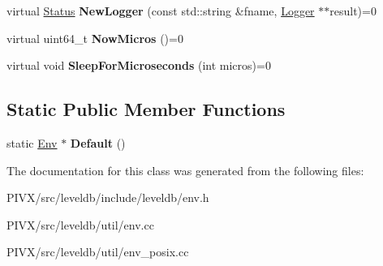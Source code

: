 \begin{DoxyCompactItemize}
\mbox{\label{classleveldb_1_1_env_a53a4c41d294fe619f13ec5b697ffc933}} 
virtual \mbox{\hyperlink{classleveldb_1_1_status}{Status}} {\bfseries New\+Logger} (const std\+::string \&fname, \mbox{\hyperlink{classleveldb_1_1_logger}{Logger}} $\ast$$\ast$result)=0
\item 
\mbox{\label{classleveldb_1_1_env_a988062bcd558ac02c62522ac2c8aa39f}} 
virtual uint64\+\_\+t {\bfseries Now\+Micros} ()=0
\item 
\mbox{\label{classleveldb_1_1_env_a43ad838cfb08db3d9e2197800cd33312}} 
virtual void {\bfseries Sleep\+For\+Microseconds} (int micros)=0
\end{DoxyCompactItemize}
\subsection*{Static Public Member Functions}
\begin{DoxyCompactItemize}
\item 
\mbox{\label{classleveldb_1_1_env_ae15b67e650ff6790059745fd1b3bf3e7}} 
static \mbox{\hyperlink{classleveldb_1_1_env}{Env}} $\ast$ {\bfseries Default} ()
\end{DoxyCompactItemize}


The documentation for this class was generated from the following files\+:\begin{DoxyCompactItemize}
\item 
P\+I\+V\+X/src/leveldb/include/leveldb/env.\+h\item 
P\+I\+V\+X/src/leveldb/util/env.\+cc\item 
P\+I\+V\+X/src/leveldb/util/env\+\_\+posix.\+cc\end{DoxyCompactItemize}
